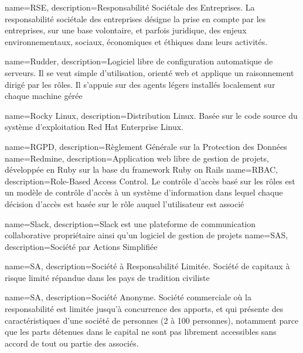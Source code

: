 {
    name=RSE,
    description={Responsabilité Sociétale des Entreprises. La responsabilité sociétale des entreprises désigne la prise en compte par les entreprises, sur une base volontaire, et parfois juridique, des enjeux environnementaux, sociaux, économiques et éthiques dans leurs activités.}
}

{
    name=Rudder,
    description={Logiciel libre de configuration automatique de serveurs. Il se veut simple d'utilisation, orienté web et applique un raisonnement dirigé par les rôles. Il s'appuie sur des agents légers installés localement sur chaque machine gérée}
}

{
    name=Rocky Linux,
    description={Distribution Linux. Basée sur le code source du système d'exploitation Red Hat Enterprise Linux.}
}

{
    name=RGPD,
    description={Règlement Générale sur la Protection des Données}
}
{
    name=Redmine,
    description={Application web libre de gestion de projets, développée en Ruby sur la base du framework Ruby on Rails}
}
{
    name=RBAC,
    description={Role-Based Access Control. Le contrôle d'accès basé sur les rôles est un modèle de contrôle d'accès à un système d'information dans lequel chaque décision d'accès est basée sur le rôle auquel l'utilisateur est associé}
}


{
    name=Slack,
    description={Slack est une plateforme de communication collaborative propriétaire ainsi qu'un logiciel de gestion de projets}
}
{
    name=SAS,
    description={Société par Actions Simplifiée}
}

{
    name=SA,
    description={Société à Responsabilité Limitée. Société de capitaux à risque limité répandue dans les pays de tradition civiliste}
}

{
    name=SA,
    description={Société Anonyme. Société commerciale où la responsabilité est limitée jusqu'à concurrence des apports, et qui présente des caractéristiques d'une société de personnes (2 à 100 personnes), notamment parce que les parts détenues dans le capital ne sont pas librement accessibles sans accord de tout ou partie des associés. }
}

